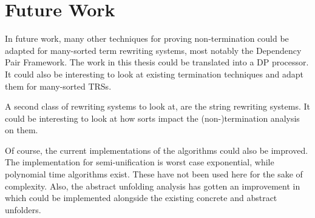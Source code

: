 \chapter{Future Work}\label{futurework}
In future work, many other techniques for proving non-termination could be adapted for many-sorted term rewriting systems, most notably the Dependency Pair Framework. The work in this thesis could be translated into a DP processor. It could also be interesting to look at existing termination techniques and adapt them for many-sorted TRSs. 

A second class of rewriting systems to look at, are the string rewriting systems. It could be interesting to look at how sorts impact the (non-)termination analysis on them. 

Of course, the current implementations of the algorithms could also be improved. The implementation for semi-unification is worst case exponential, while polynomial time algorithms exist\cite{SemiUnification}\cite{OLIART2004455}. These have not been used here for the sake of complexity. Also, the abstract unfolding analysis has gotten an improvement in \cite{PAYET:NTI} which could be implemented alongside the existing concrete and abstract unfolders. 
